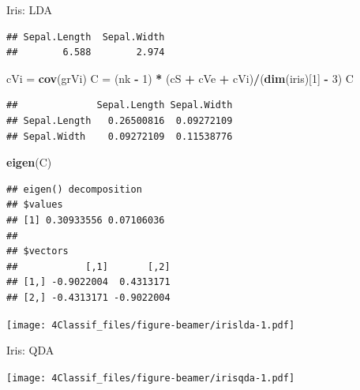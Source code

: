 \documentclass[10pt,ignorenonframetext,]{beamer}
\newenvironment{Shaded}{\begin{snugshade}}{\end{snugshade}}
\newcommand{\KeywordTok}[1]{\textcolor[rgb]{0.13,0.29,0.53}{\textbf{#1}}}
\newcommand{\DecValTok}[1]{\textcolor[rgb]{0.00,0.00,0.81}{#1}}
\newcommand{\StringTok}[1]{\textcolor[rgb]{0.31,0.60,0.02}{#1}}
\newcommand{\OperatorTok}[1]{\textcolor[rgb]{0.81,0.36,0.00}{\textbf{#1}}}
\newcommand{\NormalTok}[1]{#1}
\begin{document}
\begin{frame}[fragile]
\begin{block}{Iris: LDA}
\begin{verbatim}
## Sepal.Length  Sepal.Width 
##        6.588        2.974
\end{verbatim}

\begin{Shaded}
\begin{Highlighting}[]
\NormalTok{cVi =}\StringTok{ }\KeywordTok{cov}\NormalTok{(grVi)}
\NormalTok{C =}\StringTok{ }\NormalTok{(nk }\OperatorTok{-}\StringTok{ }\DecValTok{1}\NormalTok{) }\OperatorTok{*}\StringTok{ }\NormalTok{(cS }\OperatorTok{+}\StringTok{ }\NormalTok{cVe }\OperatorTok{+}\StringTok{ }\NormalTok{cVi)}\OperatorTok{/}\NormalTok{(}\KeywordTok{dim}\NormalTok{(iris)[}\DecValTok{1}\NormalTok{] }\OperatorTok{-}\StringTok{ }\DecValTok{3}\NormalTok{)}
\NormalTok{C}
\end{Highlighting}
\end{Shaded}

\begin{verbatim}
##              Sepal.Length Sepal.Width
## Sepal.Length   0.26500816  0.09272109
## Sepal.Width    0.09272109  0.11538776
\end{verbatim}

\begin{Shaded}
\begin{Highlighting}[]
\KeywordTok{eigen}\NormalTok{(C)}
\end{Highlighting}
\end{Shaded}

\begin{verbatim}
## eigen() decomposition
## $values
## [1] 0.30933556 0.07106036
## 
## $vectors
##            [,1]       [,2]
## [1,] -0.9022004  0.4313171
## [2,] -0.4313171 -0.9022004
\end{verbatim}

\end{block}

\end{frame}

\begin{frame}

\texttt{[image: 4Classif\_files/figure-beamer/irislda-1.pdf]}

\end{frame}

\begin{frame}

\begin{block}{Iris: QDA}

\texttt{[image: 4Classif\_files/figure-beamer/irisqda-1.pdf]}

\end{block}

\end{frame}
\end{document}
